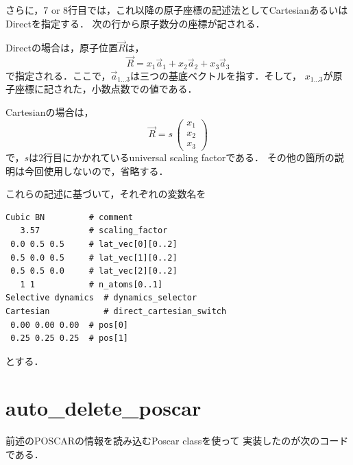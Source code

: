 さらに，7 or
8行目では，これ以降の原子座標の記述法としてCartesianあるいはDirectを指定する．
次の行から原子数分の座標が記される．

Directの場合は，原子位置\(\overrightarrow{R}\)は， \[
\overrightarrow{R} = x_1 \overrightarrow{a}_1 +
x_2 \overrightarrow{a}_2 +
x_3 \overrightarrow{a}_3
\]
で指定される．ここで，\(\overrightarrow{a}_{1 \dots 3}\)は三つの基底ベクトルを指す．そして，
\(x_{1 \dots 3}\)が原子座標に記された，小数点数での値である．

Cartesianの場合は， \[
\overrightarrow{R} = s \,
\left(\begin{array}{cc}
x_1\\
x_2\\
x_3
\end{array}\right)
\] で，\(s\)は2行目にかかれているuniversal scaling factorである．
その他の箇所の説明は今回使用しないので，省略する．

これらの記述に基づいて，それぞれの変数名を

\begin{verbatim}
Cubic BN         # comment
   3.57          # scaling_factor
 0.0 0.5 0.5     # lat_vec[0][0..2]
 0.5 0.0 0.5     # lat_vec[1][0..2]
 0.5 0.5 0.0     # lat_vec[2][0..2]
   1 1           # n_atoms[0..1]
Selective dynamics  # dynamics_selector
Cartesian           # direct_cartesian_switch
 0.00 0.00 0.00  # pos[0]
 0.25 0.25 0.25  # pos[1]
\end{verbatim}

とする．

    \section{auto\_delete\_poscar}\label{auto_delete_poscar}

前述のPOSCARの情報を読み込むPoscar classを使って
実装したのが次のコードである．

